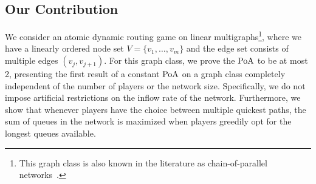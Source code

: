 

\subsection{Our Contribution}

We consider an atomic dynamic routing game on linear multigraphs\footnote{This graph class is also known in the literature as chain-of-parallel networks~\cite{DBLP:conf/sigecom/CaoCCW17,DBLP:journals/ior/ScarsiniST18}.}, where we have a linearly ordered node set $V=\{v_1,\dots,v_m\}$ and the edge set consists of multiple edges $(v_j,v_{j+1})$. For this graph class, we prove the $\operatorname*{PoA}$ to be at most 2, presenting the first result of a constant $\operatorname*{PoA}$ on a graph class completely independent of the number of players or the network size. Specifically, we do not impose artificial restrictions on the inflow rate of the network. Furthermore, we show that whenever players have the choice between multiple quickest paths, the sum of queues in the network is maximized when players greedily opt for the longest queues available.

